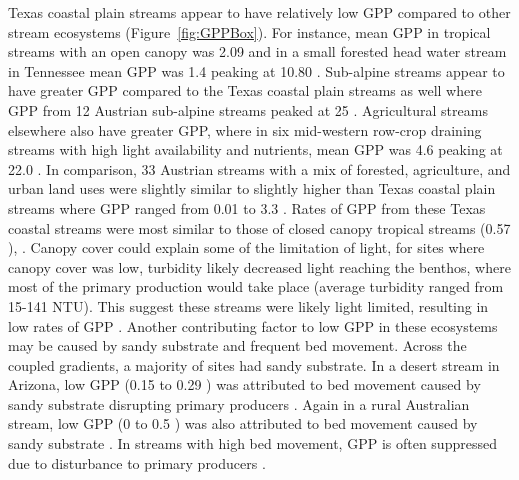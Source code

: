 Texas coastal plain streams appear to have relatively low GPP compared to other stream ecosystems (Figure~\ref{fig:GPPBox}). For instance, mean GPP in tropical streams with an open canopy was 2.09 \unit{\goxy} and in a small forested head water stream in Tennessee mean GPP was 1.4 \unit{\goxy} peaking at 10.80 \unit{\goxy} \cite{roberts_multiple_2007, marzolfEcosystemMetabolismTropical2021}. Sub-alpine streams appear to have greater GPP compared to the Texas coastal plain streams as well where GPP from 12 Austrian sub-alpine streams peaked at 25 \unit{\goxy} \cite{ulseth_climate-induced_2018}. Agricultural streams elsewhere also have greater GPP, where in six mid-western row-crop draining streams with high light availability and nutrients, mean GPP was 4.6 \unit{\goxy} peaking at 22.0 \unit{\goxy} \cite{griffithsAgriculturalLandUse2013}. In comparison, 33 Austrian streams with a mix of forested, agriculture, and urban land uses were slightly similar to slightly higher than Texas coastal plain streams where GPP ranged from 0.01 to 3.3 \unit{\goxy} \cite{fus_land_2017}. Rates of GPP from these Texas coastal streams were most similar to those of closed canopy tropical streams (0.57 \unit{\goxy}),  \cite{marzolfEcosystemMetabolismTropical2021}. Canopy cover could explain some of the limitation of light, for sites where canopy cover was low, turbidity likely decreased light reaching the benthos, where most of the primary production would take place (average turbidity ranged from 15-141 NTU). This suggest these streams were likely light limited, resulting in low rates of GPP \cite{hall_turbidity_2015,honiousTurbidityStructuresControls2021, marzolfEcosystemMetabolismTropical2021}. Another contributing factor to low GPP in these ecosystems may be caused by sandy substrate and frequent bed movement. Across the coupled gradients, a majority of sites had sandy substrate. In a desert stream in Arizona, low GPP (0.15 to 0.29 \unit{\goxy}) was attributed to bed movement caused by sandy substrate disrupting primary producers \cite{uehlingerHeterotrophicDesertStream2002}. Again in a rural Australian stream, low GPP (0 to 0.5 \unit{\goxy}) was also attributed to bed movement caused by sandy substrate \cite{atkinsonSedimentInstabilityAffects2008}. In streams with high bed movement, GPP is often suppressed due to disturbance to primary producers \cite{uehlingerEcosystemMetabolismDisturbance1998, uehlingerHeterotrophicDesertStream2002, atkinsonSedimentInstabilityAffects2008}. 

